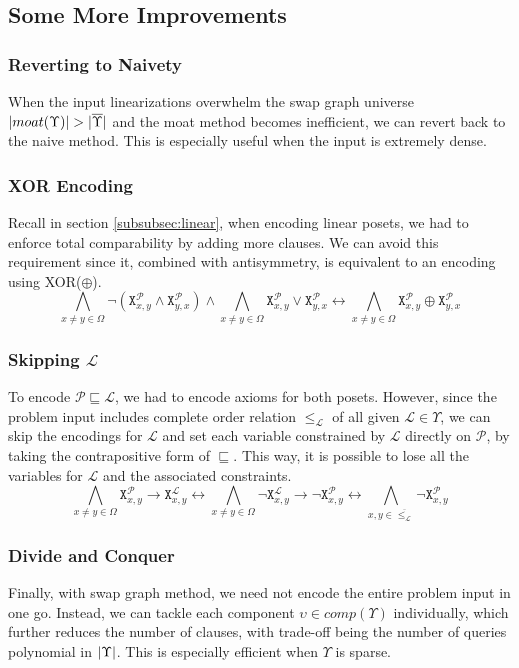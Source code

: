 \documentclass[12pt]{llncs}
\DeclarePairedDelimiter{\abs}{\lvert}{\rvert}
\let\oldleq\leq
\renewcommand{\leq}[1][]{\oldleq_{#1}}
\renewcommand{\implies}{\rightarrow}
\newcommand{\bicond}{\leftrightarrow}
\newcommand{\poset}[1]{\mathcal{#1}}
\newcommand{\uni}[1][]{\Omega_{#1}}
\newcommand{\lext}{\sqsubseteq}
\newcommand{\complmt}[1]{\overline{#1}}
\newcommand{\satvar}[2]{\mathtt{X}_{#1}^{#2}}
\begin{document}
\subsection{Some More Improvements}
\subsubsection{Reverting to Naivety}
When the input linearizations overwhelm the swap graph universe $\abs{moat(\Upsilon)} > \abs{\complmt{\Upsilon}}$ and the moat method becomes inefficient, we can revert back to the naive method. This is especially useful when the input is extremely dense.

\subsubsection{XOR Encoding}
Recall in section \ref{subsubsec:linear}, when encoding linear posets, we had to enforce total comparability by adding more clauses. We can avoid this requirement since it, combined with antisymmetry, is equivalent to an encoding using XOR($\oplus$).
\[
\bigwedge_{x \neq y \in \uni} \neg (\satvar{x,y}{\poset{P}} \wedge \satvar{y,x}{\poset{P}})
\wedge
\bigwedge_{x \neq y \in \uni} \satvar{x,y}{\poset{P}} \vee \satvar{y,x}{\poset{P}}
\bicond
\bigwedge_{x \neq y \in \uni} \satvar{x,y}{\poset{P}} \oplus \satvar{y,x}{\poset{P}}
\]

\subsubsection{Skipping $\poset{L}$}
To encode $\poset{P} \lext \poset{L}$, we had to encode axioms for both posets. However, since the problem input includes complete order relation $\leq[\poset{L}]$ of all given $\poset{L} \!\in\! \Upsilon$, we can skip the encodings for $\poset{L}$ and set each variable constrained by $\poset{L}$ directly on $\poset{P}$, by taking the contrapositive form of $\lext$. This way, it is possible to lose all the variables for $\poset{L}$ and the associated constraints.
\[
\bigwedge_{x \neq y \in \uni} \satvar{x,y}{\poset{P}} \implies \satvar{x,y}{\poset{L}}
\bicond
\bigwedge_{x \neq y \in \uni} \neg \satvar{x,y}{\poset{L}} \implies \neg \satvar{x,y}{\poset{P}}
\bicond
\bigwedge_{x,y \in \complmt{\leq[\poset{L}]}} \neg \satvar{x,y}{\poset{P}}
\]

\subsubsection{Divide and Conquer}
Finally, with swap graph method, we need not encode the entire problem input in one go. Instead, we can tackle each component $\upsilon \!\in\! comp(\Upsilon)$ individually, which further reduces the number of clauses, with trade-off being the number of queries polynomial in $\abs{\Upsilon}$. This is especially efficient when $\Upsilon$ is sparse.
\end{document}
